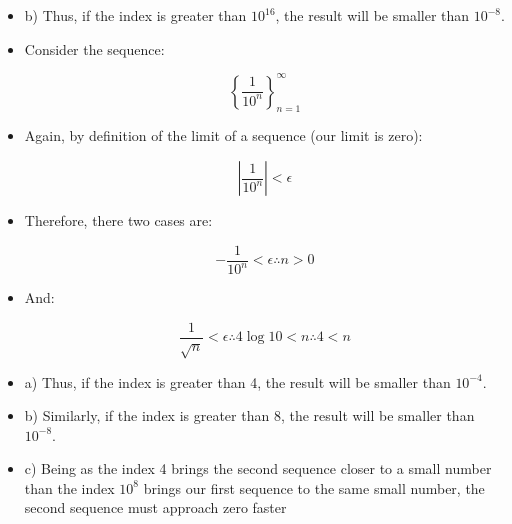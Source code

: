 \documentclass[11pt]{article}
\begin{document}
\begin{itemize}
\begin{itemize}
	\item b) Thus, if the index is greater than $10^{16}$, the result will be smaller than $10^{-8}$.
	
	\item Consider the sequence:
	
	\begin{equation*}
	\left\{ \frac{1}{10^n} \right\}_{n = 1}^{\infty}
	\end{equation*}
	
	\item Again, by definition of the limit of a sequence (our limit is zero):
	
	\begin{equation*}
	\left|\frac{1}{10^n}\right| < \epsilon
	\end{equation*}
	
	\item Therefore, there two cases are:
	
	\begin{equation*}
	-\frac{1}{10^n} < \epsilon \therefore n > 0
	\end{equation*}
	
	\item And:
	
	\begin{equation*}
	\frac{1}{\sqrt{n}} < \epsilon \therefore 4\log10 < n \therefore 4 < n
	\end{equation*}
	
	\item a) Thus, if the index is greater than 4, the result will be smaller than $10^{-4}$.
	
	\item b) Similarly, if the index is greater than 8, the result will be smaller than $10^{-8}$.
	
	\item c) Being as the index 4 brings the second sequence closer to a small number than the index $10^8$ brings our first sequence to the same small number, the second sequence must approach zero faster
	
\end{itemize}

\end{itemize}
\end{document}
